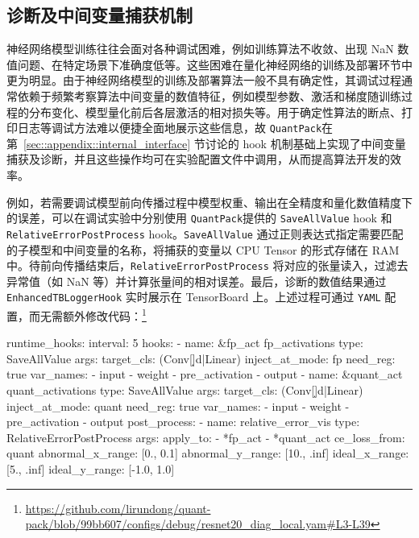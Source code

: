 \documentclass[
  fontset = source,
]{shtthesis}
\providecommand{\QP}{\texttt{QuantPack}}
\begin{document}
\subsection{诊断及中间变量捕获机制}
神经网络模型训练往往会面对各种调试困难，例如训练算法不收敛、出现 NaN 数值问题、在特定场景下准确度低等。这些困难在量化神经网络的训练及部署环节中更为明显。由于神经网络模型的训练及部署算法一般不具有确定性，其调试过程通常依赖于频繁考察算法中间变量的数值特征，例如模型参数、激活和梯度随训练过程的分布变化、模型量化前后各层激活的相对损失等。用于确定性算法的断点、打印日志等调试方法难以便捷全面地展示这些信息，故 \QP 在第~\ref{sec::appendix::internal_interface} 节讨论的 hook 机制基础上实现了中间变量捕获及诊断，并且这些操作均可在实验配置文件中调用，从而提高算法开发的效率。

例如，若需要调试模型前向传播过程中模型权重、输出在全精度和量化数值精度下的误差，可以在调试实验中分别使用 \QP 提供的 \verb|SaveAllValue| hook 和 \verb|RelativeErrorPostProcess| hook。\verb|SaveAllValue| 通过正则表达式指定需要匹配的子模型和中间变量的名称，将捕获的变量以 CPU Tensor 的形式存储在 RAM 中。待前向传播结束后，\verb|RelativeErrorPostProcess| 将对应的张量读入，过滤去异常值（如 NaN 等）并计算张量间的相对误差。最后，诊断的数值结果通过 \verb|EnhancedTBLoggerHook| 实时展示在 TensorBoard 上。上述过程可通过 \verb|YAML| 配置，而无需额外修改代码：\footnote{\url{https://github.com/lirundong/quant-pack/blob/99bb607/configs/debug/resnet20_diag_local.yam\#L3-L39}}
\begin{yaml}
runtime_hooks:
  interval: 5
  hooks:
    - name: &fp_act fp_activations
      type: SaveAllValue
      args:
        target_cls: (Conv[\d]d|Linear)
        inject_at_mode: fp
        need_reg: true
        var_names:
          - input
          - weight
          - pre_activation
          - output
    - name: &quant_act quant_activations
      type: SaveAllValue
      args:
        target_cls: (Conv[\d]d|Linear)
        inject_at_mode: quant
        need_reg: true
        var_names:
          - input
          - weight
          - pre_activation
          - output
  post_process:
    - name: relative_error_vis
      type: RelativeErrorPostProcess
      args:
        apply_to:
          - *fp_act
          - *quant_act
        ce_loss_from: quant
        abnormal_x_range: [0., 0.1]
        abnormal_y_range: [10., .inf]
        ideal_x_range: [5., .inf]
        ideal_y_range: [-1.0, 1.0]
\end{yaml}
\end{document}

